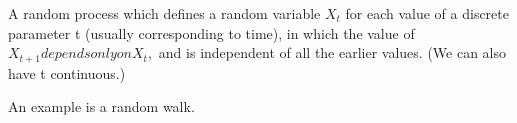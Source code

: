 A random process which defines a random variable $X_{t}$  for each 
value of a discrete parameter t (usually corresponding to time), 
in which the value of $X_{t+1} depends only on X_{t},$  and is
independent of all the earlier values. (We can also have t continuous.)
\par
An example is a random walk.